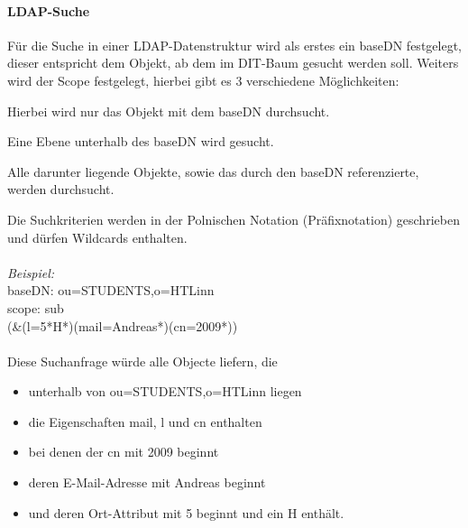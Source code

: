 \paragraph{LDAP-Suche\\}

Für die Suche in einer LDAP-Datenstruktur wird als erstes ein baseDN festgelegt, dieser entspricht dem Objekt, ab dem im DIT-Baum gesucht werden soll. Weiters wird der Scope festgelegt, hierbei gibt es 3 verschiedene Möglichkeiten:

\begin{description}[style=nextline]
	\item[base]
		Hierbei wird nur das Objekt mit dem baseDN durchsucht.
	\item[one]
		Eine Ebene unterhalb des baseDN wird gesucht.
	\item[sub]
		Alle darunter liegende Objekte, sowie das durch den baseDN referenzierte, werden durchsucht.
\end{description}
Die Suchkriterien werden in der Polnischen Notation (Präfixnotation) geschrieben und dürfen Wildcards enthalten.\\
\\
\textit{Beispiel:}\\
baseDN: ou=STUDENTS,o=HTLinn\\
scope: sub\\
(\&(l=5*H*)(mail=Andreas*)(cn=2009*))\\
\\
Diese Suchanfrage würde alle Objecte liefern, die
\begin{itemize}
	\item
		unterhalb von ou=STUDENTS,o=HTLinn liegen 
	\item	
		die Eigenschaften mail, l und cn enthalten
	\item	
		bei denen der cn mit 2009 beginnt 
	\item	
		deren E-Mail-Adresse mit Andreas beginnt 
	\item	
		und deren Ort-Attribut mit 5 beginnt und ein H enthält.
\end{itemize}